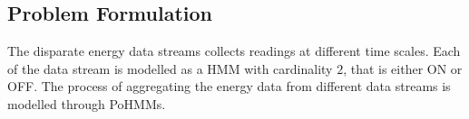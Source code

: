 \documentclass[runningheads,a4paper]{llncs}
\begin{document}
\begin{itemize}
%
%
%
%
%
%
 
\end{itemize}

\subsection{Problem Formulation}
The disparate energy data streams collects readings at different time scales. Each of the data stream is modelled as a HMM with cardinality $2$, that is either ON or OFF. The process of aggregating the energy data from different data streams is modelled through PoHMMs. 
\end{document}
